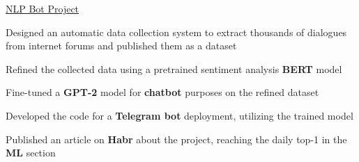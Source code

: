 \begin{cventries}
  \cventry
    {} %
    {\faGithub\acvHeaderIconSep\href{https://github.com/BlackSamorez/ebanko}{NLP Bot Project}} %
    {} %
    {} %
    {
      \begin{cvitems} %
        \item {Designed an automatic data collection system to extract thousands of dialogues from internet forums and published them as a dataset}
        \item {Refined the collected data using a pretrained sentiment analysis \textbf{BERT} model}
        \item {Fine-tuned a \textbf{GPT-2} model for \textbf{chatbot} purposes on the refined dataset}
        \item {Developed the code for a \textbf{Telegram bot} deployment, utilizing the trained model}
        \item {Published an article on \textbf{Habr} about the project, reaching the daily top-1 in the \textbf{ML} section}
      \end{cvitems}
    }
    

\end{cventries}